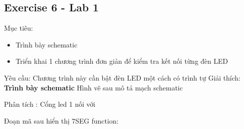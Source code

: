 \subsection{Exercise 6 - Lab 1}
Mục tiêu: 
\begin{itemize}
    \item Trình bày schematic
    \item Triển khai 1 chương trình đơn giản để kiểm tra kết nối từng đèn LED
\end{itemize}
Yêu cầu: Chương trình này cần bật đèn LED một cách có trình tự
Giải thích:
\textbf{Trình bày schematic}
Hình vẽ sau mô tả mạch schematic 

Phân tích :
Cổng led 1 nối với 








Đoạn mã sau hiển thị 7SEG function:
